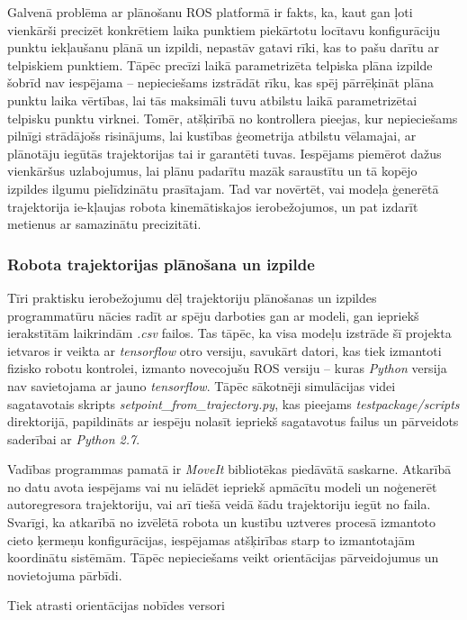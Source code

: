 \documentclass[12pt, a4paper]{article}
\numberwithin{equation}{section} %
\begin{document}
Galvenā problēma ar plānošanu ROS platformā ir fakts, ka, kaut gan ļoti vienkārši precizēt konkrētiem laika punktiem piekārtotu locītavu konfigurāciju punktu iekļaušanu plānā un izpildi, nepastāv gatavi rīki, kas to pašu darītu ar telpiskiem punktiem. Tāpēc precīzi laikā parametrizēta telpiska plāna izpilde šobrīd nav iespējama -- nepieciešams izstrādāt rīku, kas spēj pārrēķināt plāna punktu laika vērtības, lai tās maksimāli tuvu atbilstu laikā parametrizētai telpisku punktu virknei. Tomēr, atšķirībā no kontrollera pieejas, kur nepieciešams pilnīgi strādājošs risinājums, lai kustības ģeometrija atbilstu vēlamajai, ar plānotāju iegūtās trajektorijas tai ir garantēti tuvas. Iespējams piemērot dažus vienkāršus uzlabojumus, lai plānu padarītu mazāk saraustītu un tā kopējo izpildes ilgumu pielīdzinātu prasītajam. Tad var novērtēt, vai modeļa ģenerētā trajektorija ie-kļaujas robota kinemātiskajos ierobežojumos, un pat izdarīt metienus ar samazinātu precizitāti.

\subsubsection{Robota trajektorijas plānošana un izpilde}


Tīri praktisku ierobežojumu dēļ trajektoriju plānošanas un izpildes programmatūru nācies radīt ar spēju darboties gan ar modeli, gan iepriekš ierakstītām laikrindām \textit{.csv} failos. Tas tāpēc, ka visa modeļu izstrāde šī projekta ietvaros ir veikta ar \textit{tensorflow} otro versiju, savukārt datori, kas tiek izmantoti fizisko robotu kontrolei, izmanto novecojušu ROS versiju -- kuras \textit{Python} versija nav savietojama ar jauno \textit{tensorflow}. Tāpēc sākotnēji simulācijas videi sagatavotais skripts \textit{setpoint\_from\_trajectory.py}, kas pieejams \textit{testpackage/scripts} direktorijā, papildināts ar iespēju nolasīt iepriekš sagatavotus failus un pārveidots saderībai ar \textit{Python 2.7}.

Vadības programmas pamatā ir \textit{MoveIt} bibliotēkas piedāvātā saskarne. Atkarībā no datu avota iespējams vai nu ielādēt iepriekš apmācītu modeli un noģenerēt autoregresora trajektoriju, vai arī tiešā veidā šādu trajektoriju iegūt no faila. Svarīgi, ka atkarībā no izvēlētā robota un kustību uztveres procesā izmantoto cieto ķermeņu konfigurācijas, iespējamas atšķirības starp to izmantotajām koordinātu sistēmām. Tāpēc nepieciešams veikt orientācijas pārveidojumus un novietojuma pārbīdi.

Tiek atrasti orientācijas nobīdes versori
\end{document}
